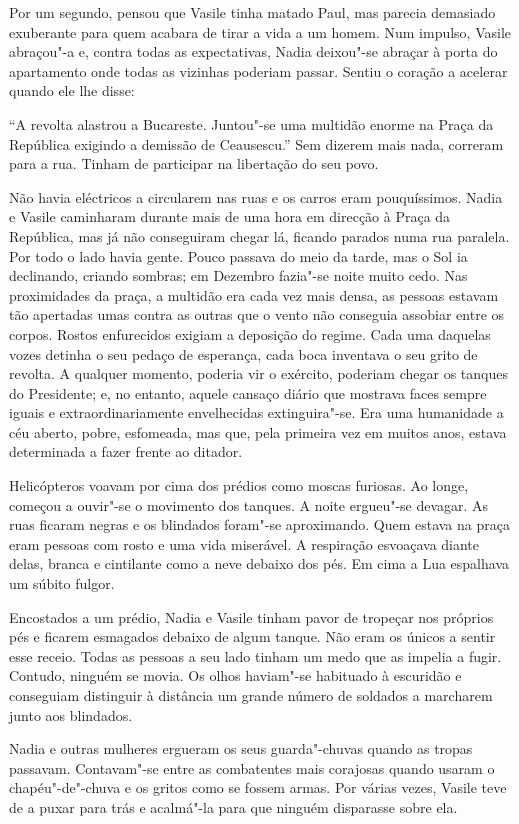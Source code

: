 Por um segundo, pensou que Vasile tinha matado Paul, mas parecia
demasiado exuberante para quem acabara de tirar a vida a um homem. Num
impulso, Vasile abraçou"-a e, contra todas as expectativas, Nadia
deixou"-se abraçar à porta do apartamento onde todas as vizinhas poderiam
passar. Sentiu o coração a acelerar quando ele lhe disse:

``A revolta alastrou a Bucareste. Juntou"-se uma multidão enorme na Praça
da República exigindo a demissão de
Ceausescu.'' Sem dizerem mais nada, correram para a rua. Tinham de
participar na libertação do seu povo.

Não havia eléctricos a circularem nas ruas e os carros eram
pouquíssimos. Nadia e Vasile caminharam durante mais de uma hora em
direcção à Praça da República, mas já não conseguiram chegar lá, ficando
parados numa rua paralela. Por todo o lado havia gente. Pouco passava do
meio da tarde, mas o Sol ia declinando, criando sombras; em Dezembro
fazia"-se noite muito cedo. Nas proximidades da praça, a multidão era
cada vez mais densa, as pessoas estavam tão apertadas umas contra as
outras que o vento não conseguia assobiar entre os corpos. Rostos
enfurecidos exigiam a deposição do regime. Cada uma daquelas vozes
detinha o seu pedaço de esperança, cada boca inventava o seu grito de
revolta. A qualquer momento, poderia vir o exército, poderiam chegar
os tanques do Presidente; e, no entanto, aquele cansaço diário que
mostrava faces sempre iguais e extraordinariamente envelhecidas
extinguira"-se. Era uma humanidade a céu aberto, pobre, esfomeada, mas
que, pela primeira vez em muitos anos, estava determinada a fazer frente
ao ditador.

Helicópteros voavam por cima dos prédios como moscas furiosas. Ao longe, começou a ouvir"-se o movimento dos tanques. A
noite ergueu"-se devagar. As ruas ficaram negras e os blindados foram"-se
aproximando. Quem estava na praça eram pessoas com rosto e uma vida
miserável. A respiração esvoaçava diante delas, branca e cintilante como
a neve debaixo dos pés. Em cima a Lua espalhava um súbito fulgor.


Encostados a um prédio, Nadia e Vasile tinham pavor de tropeçar nos
próprios pés e ficarem esmagados debaixo de algum tanque. Não eram os
únicos a sentir esse receio. Todas as pessoas a seu lado tinham um medo
que as impelia a fugir. Contudo, ninguém se movia. Os olhos haviam"-se
habituado à escuridão e conseguiam distinguir à distância um grande
número de soldados a marcharem junto aos blindados.

Nadia e outras mulheres ergueram os seus guarda"-chuvas quando as tropas passavam. Contavam"-se entre as combatentes mais
corajosas quando usaram o chapéu"-de"-chuva e os gritos como se fossem armas. Por várias vezes, Vasile teve
de a puxar para trás e acalmá"-la para que ninguém disparasse sobre
ela.

